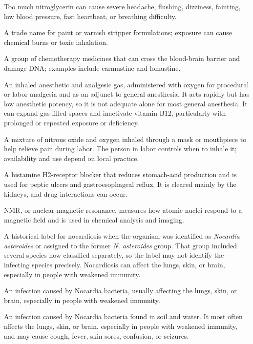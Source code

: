  Too much nitroglycerin can cause severe headache, flushing, dizziness, fainting, low blood pressure, fast heartbeat, or breathing difficulty.

 A trade name for paint or varnish stripper formulations; exposure can cause chemical burns or toxic inhalation.

 A group of chemotherapy medicines that can cross the blood-brain barrier and damage DNA; examples include carmustine and lomustine.

 An inhaled anesthetic and analgesic gas, administered with oxygen for procedural or labor analgesia and as an adjunct to general anesthesia.
It acts rapidly but has low anesthetic potency, so it is not adequate alone
for most general anesthesia. It can expand gas-filled spaces and inactivate
vitamin B12, particularly with prolonged or repeated exposure or deficiency.

 A mixture of nitrous oxide and oxygen inhaled through a mask or mouthpiece to help relieve pain during labor. The person in labor controls when to inhale it; availability and use depend on local practice.

 A histamine H2-receptor blocker that reduces stomach-acid production and is used for peptic ulcers and gastroesophageal reflux. It is cleared mainly by the kidneys, and drug interactions can occur.

 NMR, or nuclear magnetic resonance, measures how atomic nuclei respond to a magnetic field and is used in chemical analysis and imaging.

 A historical label for nocardiosis when the organism was identified as \textit{Nocardia asteroides} or assigned to the former \textit{N. asteroides} group. That group included several species now classified separately, so the label may not identify the infecting species precisely. Nocardiosis can affect the lungs, skin, or brain, especially in people with weakened immunity.

 An infection caused by Nocardia bacteria, usually affecting the lungs, skin, or brain, especially in people with weakened immunity.

 An infection caused by Nocardia bacteria found in soil and water. It most often affects the lungs, skin, or brain, especially in people with weakened immunity, and may cause cough, fever, skin sores, confusion, or seizures.

